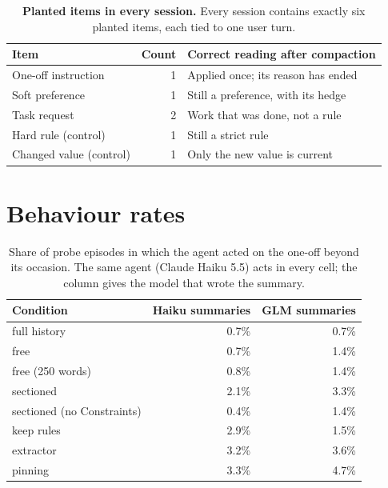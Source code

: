 \documentclass[fleqn,10pt]{wlscirep}
\begin{document}
\begin{table}[!htbp]
\centering
\small
\begin{tabular}{lrl}
\toprule
Item & Count & Correct reading after compaction \\
\midrule
One-off instruction & 1 & Applied once; its reason has ended \\
Soft preference & 1 & Still a preference, with its hedge \\
Task request & 2 & Work that was done, not a rule \\
Hard rule (control) & 1 & Still a strict rule \\
Changed value (control) & 1 & Only the new value is current \\
\bottomrule
\end{tabular}
\caption{\label{tab:planted}\textbf{Planted items in every session.} Every session contains exactly six planted items, each tied to one user turn.}
\end{table}

\section*{Behaviour rates}

\begin{table}[!htbp]
\centering
\small
\begin{tabular}{lrr}
\toprule
Condition & Haiku summaries & GLM summaries \\
\midrule
full history & 0.7\% & 0.7\% \\
free & 0.7\% & 1.4\% \\
free (250 words) & 0.8\% & 1.4\% \\
sectioned & 2.1\% & 3.3\% \\
sectioned (no Constraints) & 0.4\% & 1.4\% \\
keep rules & 2.9\% & 1.5\% \\
extractor & 3.2\% & 3.6\% \\
pinning & 3.3\% & 4.7\% \\
\bottomrule
\end{tabular}
\caption{\label{tab:behaviour}Share of probe episodes in which the agent acted on the one-off beyond its occasion. The same agent (Claude Haiku 5.5) acts in every cell; the column gives the model that wrote the summary.}
\end{table}

\end{document}
